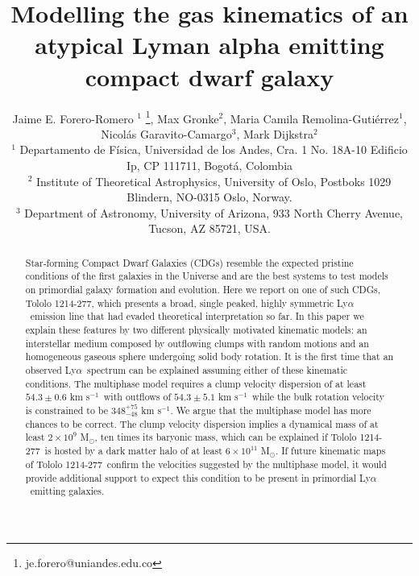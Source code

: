 \documentclass[a4,useAMS,usenatbib,usegraphicx]{mn2e}
\newcommand{\tol}{Tololo 1214-277}
\newcommand{\lya}{\ifmmode{{\rm Ly}\alpha}\else Ly$\alpha$\ \fi}
\newcommand{\kms}{km s$^{-1}$}
\newcommand{\sigmaclump}{$54.3\pm 0.6$ km s$^{-1}$}
\newcommand{\inftyclump}{$54.3\pm 5.1$ km s$^{-1}$}
\begin{document}
\title[An atypical \lya dwarf galaxy]{
Modelling the gas kinematics of an atypical Lyman alpha emitting compact dwarf galaxy}
\author[J.E. Forero-Romero et al.]
{Jaime E. Forero-Romero $^{1}$ \thanks{je.forero@uniandes.edu.co},
Max Gronke$^2$, 
Maria Camila Remolina-Guti\'errez$^1$,
\newauthor
Nicol\'as Garavito-Camargo$^3$, 
Mark Dijkstra$^2$\\
$^1$ Departamento de F\'isica, Universidad de los Andes, Cra. 1
  No. 18A-10 Edificio Ip, CP 111711, Bogot\'a, Colombia \\
$^2$ Institute of Theoretical Astrophysics, University of Oslo,
Postboks 1029 Blindern, NO-0315 Oslo, Norway.\\
$^3$ Department of Astronomy, University of Arizona, 933 North Cherry
Avenue, Tucson, AZ 85721, USA. 
}


\maketitle


\begin{abstract}
	
Star-forming Compact Dwarf Galaxies (CDGs) 
resemble the expected pristine conditions of the first galaxies in the
Universe and are the best systems to test models on primordial galaxy
formation and evolution. 
Here we report on one of such CDGs, \tol, which presents
a broad, single peaked, highly symmetric \lya emission line that had
evaded theoretical interpretation so far.  
In this paper we explain these features by two different physically
motivated kinematic models: 
an interstellar medium composed by outflowing clumps with 
random motions and an homogeneous gaseous sphere undergoing solid body
rotation.
It is the first time that an observed \lya spectrum can be explained
assuming either of these kinematic conditions.
The multiphase model requires a clump velocity dispersion of
at least \sigmaclump\ with outflows of \inftyclump\, while the
bulk rotation velocity is constrained to be $348^{+75}_{-48}$ \kms.
We argue that the multiphase model has more chances to be correct.
The clump velocity dispersion implies a dynamical mass of at least $2\times
10^{9}$ M$_{\odot}$, ten times its baryonic mass, which can be
explained if \tol\ is hosted by a dark matter halo of at least
$6\times 10^{11}$ M$_{\odot}$.
If future kinematic maps of \tol\ confirm the velocities suggested by the
multiphase model, it would provide additional support to expect this
condition to be present  in primordial \lya emitting galaxies.  
\end{abstract}
\end{document}
